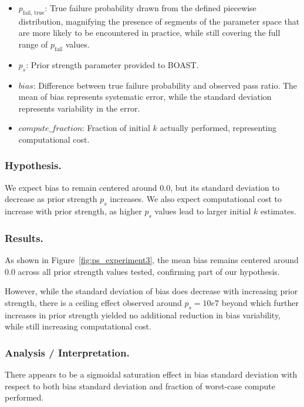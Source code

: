     \begin{itemize}
        \item $p_\text{fail, true}$: True failure probability drawn from the defined piecewise distribution, magnifying the presence of segments of the parameter space that are more likely to be encountered in practice, while still covering the full range of $p_\text{fail}$ values.
        \item $p_s$: Prior strength parameter provided to BOAST.
        \item $bias$: Difference between true failure probability and observed pass ratio. The mean of bias represents systematic error, while the standard deviation represents variability in the error.
        \item $compute\_fraction$: Fraction of initial $k$ actually performed, representing computational cost.
    \end{itemize}

    \subsubsection{Hypothesis.}

    We expect bias to remain centered around $0.0$, but its standard deviation to decrease as prior strength $p_s$ increases. We also expect computational cost to increase with prior strength, as higher $p_s$ values lead to larger initial $k$ estimates.

    \subsubsection{Results.}

    As shown in Figure~\ref{fig:ps_experiment3}, the mean bias remains centered around $0.0$ across all prior strength values tested, confirming part of our hypothesis.
    
    However, while the standard deviation of bias does decrease with increasing prior strength, there is a ceiling effect observed around $p_s = 10e7$ beyond which further increases in prior strength yielded no additional reduction in bias variability, while still increasing computational cost.

    \subsubsection{Analysis / Interpretation.}

    There appears to be a sigmoidal saturation effect in bias standard deviation with respect to both bias standard deviation and fraction of worst-case compute performed.

